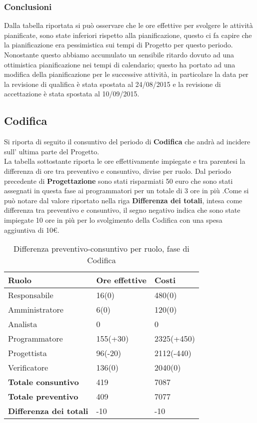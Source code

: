 \subsubsection{Conclusioni}

Dalla tabella riportata si può osservare che le ore effettive per svolgere le attività pianificate, sono state inferiori rispetto alla pianificazione, questo ci fa capire che la pianificazione era pessimistica sui tempi di Progetto per questo periodo.
Nonostante questo abbiamo accumulato un sensibile ritardo dovuto ad una ottimistica pianificazione nei tempi di calendario; questo ha portato ad una modifica della pianificazione per le successive attività, in particolare la data per la revisione di qualifica è stata spostata al 24/08/2015 e la revisione di accettazione è stata spostata al 10/09/2015.


\subsection{Codifica}

Si riporta di seguito il consuntivo del periodo di \textbf{Codifica} che andrà ad incidere sull' ultima parte del Progetto.\\
La tabella sottostante riporta le ore effettivamente impiegate e tra parentesi la differenza di ore tra preventivo e consuntivo, divise per ruolo. Dal periodo precedente di \textbf{Progettazione} sono stati risparmiati 50 euro che sono stati assegnati in questa fase ai programmatori per un totale di 3 ore in più .Come si può notare dal valore riportato nella riga \textbf{Differenza dei totali}, intesa come differenza tra preventivo e consuntivo, il segno negativo indica che sono state impiegate 10 ore in più per lo svolgimento della Codifica con una spesa aggiuntiva di 10\euro.

	\begin{table}[H]
		\centering
	  \begin{tabular}{p{}p{}
		    							p{}}
		   \toprule Ruolo & Ore effettive & Costi \\
		   \midrule
		   Responsabile & 16(0) & 480(0) \\
		   Amministratore & 6(0) & 120(0) \\
		   Analista & 0 & 0 \\
		   Programmatore & 155(+30) & 2325(+450) \\
		   Progettista & 96(-20) & 2112(-440) \\
		   Verificatore & 136(0) & 2040(0) \\
		   \hline
		   \textbf{Totale consuntivo} & 419 & 7087 \\
		   \textbf{Totale preventivo} & 409 & 7077 \\
		   \textbf{Differenza dei totali} & -10 & -10 \\
		   \bottomrule
	 \end{tabular}
	 	\label{tab:costuntivoCodifica}
	 	\caption{Differenza preventivo-consuntivo per ruolo, fase di Codifica}
	\end{table}


